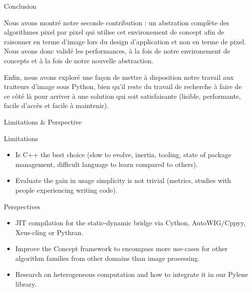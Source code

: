 \documentclass[12pt,aspectratio=169]{beamer}
\begin{document}
\begin{frame}{Conclusion}
{    Nous avons montré notre seconde contribution : un abstration complète des algorithmes pixel par pixel qui utilise cet environement de concept afin de raisonner en terme d'image lors du design d'application et non en terme de pixel.
    Nous avons donc validé les performances, à la fois de notre environement de concepts et à la fois de notre nouvelle abstraction.

    Enfin, nous avons exploré une façon de mettre à disposition notre travail aux traiteurs d'image sous Python, bien qu'il reste du travail de recherche à faire de ce côté là pour arriver à une solution qui soit satisfaisante (lisible, performante, facile d'accès et facile à maintenir).
  }
\end{frame}

\begin{frame}{Limitations \& Perspective}
  \begin{alertblock}{Limitations}
    \footnotesize
    \begin{itemize}
      \item Is C++ the best choice (slow to evolve, inertia, tooling, state of package management, difficult language
            to learn compared to others).
      \item Evaluate the gain in usage simplicity is not trivial (metrics, studies with people experiencing writing
            code).
    \end{itemize}
  \end{alertblock}
  \begin{alertblock}{Perspectives}
    \footnotesize
    \begin{itemize}
      \item JIT compilation for the static-dynamic bridge via Cython, AutoWIG/Cppyy, Xeus-cling or Pythran.
      \item Improve the Concept framework to encompass more use-cases for other algorithm families from other domains
            than image processing.
      \item Research on heterogeneous computation and how to integrate it in our Pylene library.
    \end{itemize}
  \end{alertblock}

\end{frame}
\end{document}
